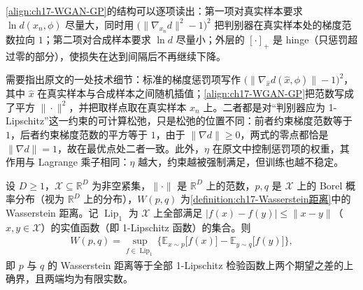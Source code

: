 \documentclass[../../main.tex]{subfiles}
\begin{document}
\begin{remark}
\eqref{align:ch17-WGAN-GP}的结构可以逐项读出：第一项对真实样本要求 $\ln d(x_n,\phi)$ 尽量大，同时用 $\big(\|\nabla_{x_n}d\|^{2}-1\big)^{2}$ 把判别器在真实样本处的梯度范数拉向 $1$；第二项对合成样本要求 $\ln d$ 尽量小；外层的 $[\cdot]_+$ 是 hinge（只惩罚超过零的部分），使损失在达到间隔后不再继续下降。

需要指出原文的一处技术细节：标准的梯度惩罚项写作 $\big(\|\nabla_{\hat{x}}d(\hat{x},\phi)\|-1\big)^2$，其中 $\hat{x}$ 在真实样本与合成样本之间随机插值；\eqref{align:ch17-WGAN-GP}把范数写成了平方 $\|\cdot\|^{2}$，并把取样点取在真实样本 $x_n$ 上。二者都是对“判别器应为 1-Lipschitz”这一约束的可计算松弛，只是松弛的位置不同：前者约束梯度范数等于 $1$，后者约束梯度范数的平方等于 $1$，由于 $\|\nabla d\|\geqslant0$，两式的零点都恰是 $\|\nabla d\|=1$，故在最优点处二者一致。此外，$\eta$ 在原文中控制惩罚项的权重，其作用与 Lagrange 乘子相同：$\eta$ 越大，约束越被强制满足，但训练也越不稳定。
\end{remark}

\begin{proposition}\label{proposition:ch17-KR对偶}
设 $D\geqslant1$，$\mathcal{X}\subseteq\mathbb{R}^{D}$ 为非空紧集，$\|\cdot\|$ 是 $\mathbb{R}^{D}$ 上的范数，$p,q$ 是 $\mathcal{X}$ 上的 Borel 概率分布（视为 $\mathbb{R}^{D}$ 上的分布），$W(p,q)$ 为\cref{definition:ch17-Wasserstein距离}中的 Wasserstein 距离。记 $\operatorname{Lip}_1$ 为 $\mathcal{X}$ 上全部满足 $\left|f(x)-f(y)\right|\leqslant\|x-y\|$（$x,y\in\mathcal{X}$）的实值函数（即 1-Lipschitz 函数）的集合。则
\begin{align}
W(p,q)=\sup_{f\in\operatorname{Lip}_1}\Big\{\mathbb{E}_{x\sim p}\big[f(x)\big]-\mathbb{E}_{y\sim q}\big[f(y)\big]\Big\},
\label{align:ch17-KR对偶}
\end{align}
即 $p$ 与 $q$ 的 Wasserstein 距离等于全部 1-Lipschitz 检验函数上两个期望之差的上确界，且两端均为有限实数。
\end{proposition}
\end{document}

